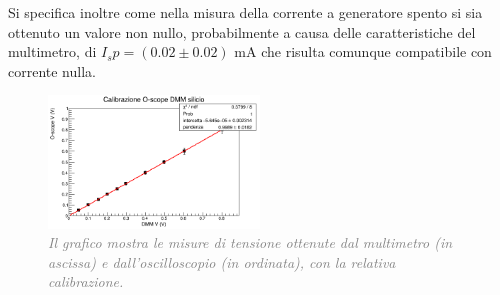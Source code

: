 \documentclass[a4paper,11pt]{article}
\begin{document}
Si specifica inoltre come nella misura della corrente a generatore spento si sia ottenuto un valore non nullo, probabilmente a causa delle caratteristiche del multimetro, di $I_sp=(0.02 \pm 0.02)$ $ \mathrm{mA}$ che risulta comunque compatibile con corrente nulla. 
\begin{figure}[H]
    \centering
    \includegraphics[width=0.5\textwidth]{pictures/calibrazione.png}
    \caption{\textit{\textcolor{gray}{Il grafico mostra le misure di tensione ottenute dal multimetro (in ascissa) e dall'oscilloscopio (in ordinata), con la relativa calibrazione.}}}
    \label{graph::calibrazione}
\end{figure}
\end{document}
